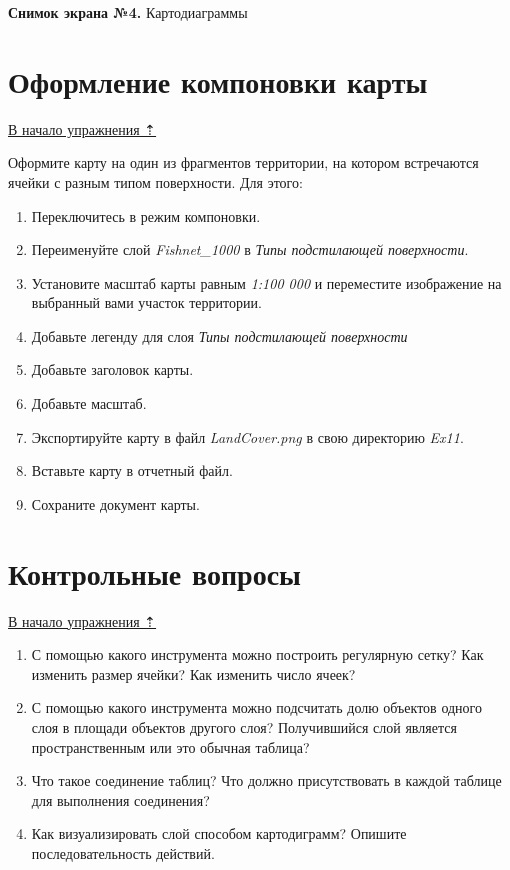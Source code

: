 \documentclass[]{book}
\theoremstyle{definition}
\theoremstyle{definition}
\theoremstyle{definition}
\theoremstyle{remark}
\begin{document}
\textbf{Снимок экрана №4.} Картодиаграммы

\hypertarget{land-cover-hydro-layout}{%
\section{Оформление компоновки карты}\label{land-cover-hydro-layout}}

\protect\hyperlink{land-cover-hydro}{В начало упражнения ⇡}

Оформите карту на один из фрагментов территории, на котором встречаются
ячейки с разным типом поверхности. Для этого:

\begin{enumerate}
\def\labelenumi{\arabic{enumi}.}
\item
  Переключитесь в режим компоновки.
\item
  Переименуйте слой \emph{Fishnet\_1000} в \emph{Типы подстилающей
  поверхности}.
\item
  Установите масштаб карты равным \emph{1:100 000} и переместите
  изображение на выбранный вами участок территории.
\item
  Добавьте легенду для слоя \emph{Типы подстилающей поверхности}
\item
  Добавьте заголовок карты.
\item
  Добавьте масштаб.
\item
  Экспортируйте карту в файл \emph{LandCover.png} в свою директорию
  \emph{Ex11}.
\item
  Вставьте карту в отчетный файл.
\item
  Сохраните документ карты.
\end{enumerate}

\hypertarget{land-cover-hydro-questions}{%
\section{Контрольные вопросы}\label{land-cover-hydro-questions}}

\protect\hyperlink{land-cover-hydro}{В начало упражнения ⇡}

\begin{enumerate}
\def\labelenumi{\arabic{enumi}.}
\item
  С помощью какого инструмента можно построить регулярную сетку? Как
  изменить размер ячейки? Как изменить число ячеек?
\item
  С помощью какого инструмента можно подсчитать долю объектов одного
  слоя в площади объектов другого слоя? Получившийся слой является
  пространственным или это обычная таблица?
\item
  Что такое соединение таблиц? Что должно присутствовать в каждой
  таблице для выполнения соединения?
\item
  Как визуализировать слой способом картодиграмм? Опишите
  последовательность действий.
\end{enumerate}
\end{document}
